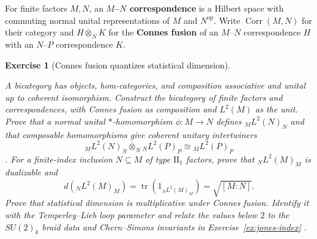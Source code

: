 \documentclass{article}
\newtheorem{exercise}{Exercise}
\newcommand{\trace}{\operatorname{tr}}
\begin{document}
For finite factors $M,N$, an \textbf{$M$--$N$ correspondence} is a Hilbert
space with commuting normal unital representations of $M$ and
$N^{\mathrm{op}}$. Write $\operatorname{Corr}(M,N)$ for their category and
$H\mathbin{\overline\otimes_N}K$ for the \textbf{Connes fusion} of an
$M$--$N$ correspondence $H$ with an $N$--$P$ correspondence $K$.

\begin{exercise}[Connes fusion quantizes statistical dimension]
\label{ex:correspondence-functor}\leavevmode\par
\textit{A bicategory has objects, hom-categories, and composition associative
and unital up to coherent isomorphism. Construct the bicategory of finite
factors and correspondences, with Connes fusion as composition and $L^2(M)$
as the unit. Prove that a normal unital $*$-homomorphism $\phi:M\to N$
defines ${}_ML^2(N)_N$ and that
composable homomorphisms give coherent unitary intertwiners}
\[
{}_{M}L^2(N)_{N}\mathbin{\overline\otimes_N}{}_{N}L^2(P)_{P}
\cong{}_{M}L^2(P)_{P}
\]
\cite{jones-sunder}. \textit{For a finite-index inclusion $N\subseteq M$ of
type $\mathrm{II}_1$ factors, prove that ${}_NL^2(M)_M$ is dualizable and}
\[
d({}_NL^2(M)_M)=\trace(1_{{}_NL^2(M)_M})=\sqrt{[M:N]}.
\]
\textit{Prove that statistical dimension is multiplicative under Connes
fusion. Identify it with the Temperley--Lieb loop parameter and relate the
values below $2$ to the $SU(2)_k$ braid data and Chern--Simons invariants in
Exercise~\ref{ex:jones-index}} \cite{jones-index}.\par
\end{exercise}
\end{document}
